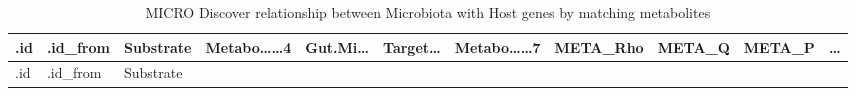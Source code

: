 \documentclass[
]{article}
\begin{document}
\begin{longtable}[]{@{}lllllllllll@{}}
\caption{\label{tab:MICRO-Discover-relationship-between-Microbiota-with-Host-genes-by-matching-metabolites}MICRO Discover relationship between Microbiota with Host genes by matching metabolites}\tabularnewline
\toprule
\begin{minipage}[b]{0.03\columnwidth}\raggedright
.id\strut
\end{minipage} & \begin{minipage}[b]{0.07\columnwidth}\raggedright
.id\_from\strut
\end{minipage} & \begin{minipage}[b]{0.07\columnwidth}\raggedright
Substrate\strut
\end{minipage} & \begin{minipage}[b]{0.09\columnwidth}\raggedright
Metabo\ldots\ldots4\strut
\end{minipage} & \begin{minipage}[b]{0.07\columnwidth}\raggedright
Gut.Mi\ldots{}\strut
\end{minipage} & \begin{minipage}[b]{0.07\columnwidth}\raggedright
Target\ldots{}\strut
\end{minipage} & \begin{minipage}[b]{0.09\columnwidth}\raggedright
Metabo\ldots\ldots7\strut
\end{minipage} & \begin{minipage}[b]{0.07\columnwidth}\raggedright
META\_Rho\strut
\end{minipage} & \begin{minipage}[b]{0.07\columnwidth}\raggedright
META\_Q\strut
\end{minipage} & \begin{minipage}[b]{0.07\columnwidth}\raggedright
META\_P\strut
\end{minipage} & \begin{minipage}[b]{0.03\columnwidth}\raggedright
\ldots{}\strut
\end{minipage}\tabularnewline
\midrule
\endfirsthead
\toprule
\begin{minipage}[b]{0.03\columnwidth}\raggedright
.id\strut
\end{minipage} & \begin{minipage}[b]{0.07\columnwidth}\raggedright
.id\_from\strut
\end{minipage} & \begin{minipage}[b]{0.07\columnwidth}\raggedright
Substrate\strut
\end{minipage} & \begin{minipage}[b]{0.09\columnwidth}\raggedright

\end{minipage}
\end{longtable}
\end{document}
